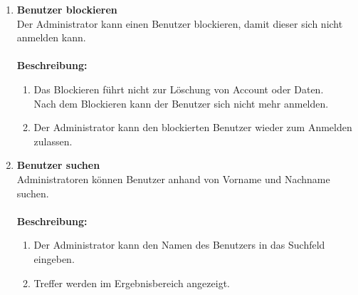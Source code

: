 \documentclass[parskip=full,11pt]{scrartcl}
\def\threedigits#1{%
  \ifnum#1<10 0\fi
  \ifnum#1<1 0\fi
  \number#1}
\begin{document}
\begin{enumerate}[label={\textbf{/F\protect\threedigits{\theenumi}0/}}, leftmargin=*, resume]
\item \label{FAA6} \colorbox{shadecolor} {\textbf{Benutzer blockieren}}\\ Der Administrator kann einen Benutzer blockieren, damit dieser sich nicht anmelden kann.\\\\
\textbf{Beschreibung:}\\
\begin{enumerate}[label=(\arabic*), leftmargin=*]
	\item Das Blockieren führt nicht zur Löschung von Account oder Daten.\\
		Nach dem Blockieren kann der Benutzer sich nicht mehr anmelden.
	\item Der Administrator kann den blockierten Benutzer wieder zum Anmelden zulassen. \\ 
	\end{enumerate}


\item \label{FAA7} \colorbox{shadecolor} {\textbf{Benutzer suchen}}\\  Administratoren können Benutzer anhand von Vorname und Nachname suchen.\\\\
\textbf{Beschreibung:}\\
\begin{enumerate}[label=(\arabic*), leftmargin=*]
	\item Der Administrator kann den Namen des Benutzers in das Suchfeld eingeben.\\
	\item Treffer werden im Ergebnisbereich angezeigt.
	\end{enumerate}
\end{enumerate}
\end{document}
